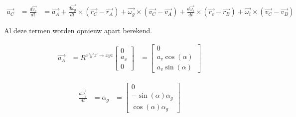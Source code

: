\begin{equation*}
\begin{split}
\overrightarrow{a_{C}}&=\frac{d\overrightarrow{v_{c}}}{dt}
&=	\overrightarrow{a_{A}} + \frac{d\overrightarrow{\omega_{g}}}{dt}\times(\overrightarrow{r_{C}}-\overrightarrow{r_{A}}) + \overrightarrow{\omega_{g}}\times(\overrightarrow{v_{C}}-\overrightarrow{v_{A}}) + \frac{d\overrightarrow{\omega_i}}{dt}\times(\overrightarrow{r_{c}}-\overrightarrow{r_{B}})+\overrightarrow{\omega_{i}}\times(\overrightarrow{v_{C}}-\overrightarrow{v_{B}})
\end{split}
\end{equation*}

Al deze termen worden opnieuw apart berekend.

\begin{equation*}
\begin{split}
\overrightarrow{a_{A}}
&=R^{x'y'z' \rightarrow xyz}
	\begin{bmatrix}
	0\\
	a_v\\
	0
	\end{bmatrix}
&=	\begin{bmatrix}
	0\\
	a_v\cos(\alpha)\\
	a_v\sin(\alpha)\
	\end{bmatrix}
\end{split}
\end{equation*}

\begin{equation*}
\begin{split}
\frac{d\overrightarrow{\omega_g}}{dt}&=\alpha_{g}
&=	\begin{bmatrix}
	0\\
	-\sin(\alpha)\alpha_{g}\\
	\cos(\alpha)\alpha_{g}\
	\end{bmatrix}
\end{split}
\end{equation*}

